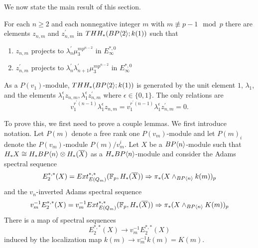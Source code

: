 We now state the main result of this section.
\begin{thm}\label{mod p v_2}
For each $n \ge 2$ and each nonnegative integer $m$ with $m \not\equiv p - 1 \mod{p}$ there are elements $z_{n,m}$ and $z^{\prime}_{n,m}$ in $THH_*(BP\langle 2 \rangle;k(1))$ such that
\begin{enumerate} 
\item $z_{n,m}$ projects to $\lambda^{\prime}_n\mu_3^{mp^{n-2}}$ in $E_{\infty}^{*,0}$
\item $z_{n,m}^{\prime}$ projects to $\lambda^{\prime}_n\lambda^{\prime}_{n+1}\mu_3^{mp^{n-2}}$ in $E_{\infty}^{*,0}$
\end{enumerate}
 As a $P(v_1)$-module, $THH_*(BP\langle 2 \rangle;k(1))$ is generated by the unit element
$1$, $\lambda_1$, and the elements $\lambda_1^{\epsilon}z_{n,m},\lambda_1^{\epsilon}z_{n,m}^{\prime}$ where $\epsilon\in\{0,1\}$. The only relations are
\[v_1^{r^{\prime}(n-1)}\lambda_1^{\epsilon}z_{n,m}=v_1^{r^{\prime}(n-1)}\lambda_1^{\epsilon}z_{n,m}^{\prime}=0.\]
\end{thm}
To prove this, we first need to prove a couple lemmas. We first introduce notation. Let $P(m)$ denote a free rank one $P(v_m)$-module and let $P(m)_i$ denote the $P(v_m)$-module $P(m)/v_m^i$. Let $X$ be a $BP\langle n \rangle$-module such that $H_*X\cong H_*BP\langle n \rangle\otimes H_*(\overline{X})$ as a $H_*BP\langle n \rangle$-module and consider the Adams spectral sequence
\begin{equation}\label{ASSX} E_2^{*,*}(X)=Ext_{E(Q_m)}^{*,*}(\mathbb{F}_p,H_*(\overline{X}))\Rightarrow \pi_*(X\wedge_{BP\langle n \rangle}k(m))_p\end{equation}
and the $v_n$-inverted Adams spectral sequence 
\begin{equation}\label{v2invertASSX} v_m^{-1}E_2^{*,*}(X)=v_m^{-1}Ext_{E(Q_m)}^{*,*}(\mathbb{F}_p,H_*(\overline{X})) \Rightarrow \pi_*(X\wedge_{BP\langle n \rangle}K(m))_p\end{equation}
There is a map of spectral sequences 
\[ E_2^{*,*}(X) \longrightarrow v_m^{-1}E_2^{*,*}(X)\]
induced by the localization map $k(m)\to v_m^{-1}k(m)=K(m).$ 

